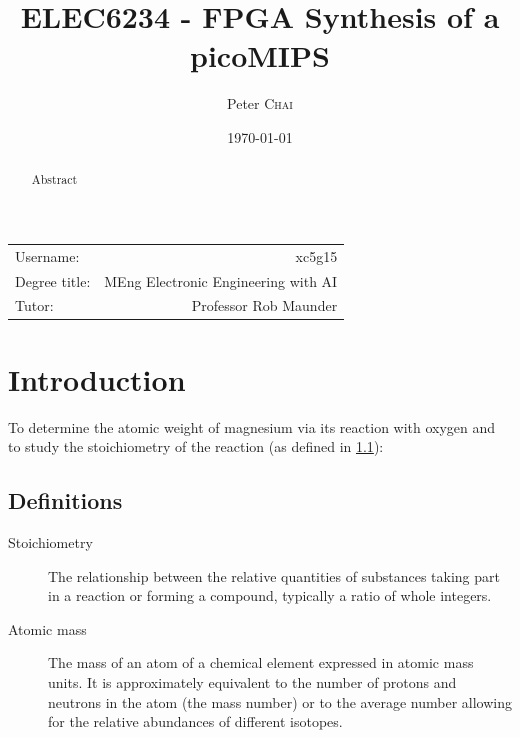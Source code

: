\documentclass{article}
\title{ELEC6234 - FPGA Synthesis of a picoMIPS} %
\author{Peter \textsc{Chai}} %
\date{\today} %
\begin{document}
\maketitle %

\begin{center}
\begin{tabular}{l r}
Username: & xc5g15 \\ %
Degree title: & MEng Electronic Engineering with AI \\ %
Tutor: & Professor Rob Maunder %
\end{tabular}
\end{center}



\begin{abstract}
    Abstract
\end{abstract}

\section{Introduction}

To determine the atomic weight of magnesium via its reaction with oxygen and to study the stoichiometry of the reaction (as defined in \ref{definitions}):


\subsection{Definitions}
\label{definitions}
\begin{description}
\item[Stoichiometry]
The relationship between the relative quantities of substances taking part in a reaction or forming a compound, typically a ratio of whole integers.
\item[Atomic mass]
The mass of an atom of a chemical element expressed in atomic mass units. It is approximately equivalent to the number of protons and neutrons in the atom (the mass number) or to the average number allowing for the relative abundances of different isotopes.
\end{description}
\end{document}
